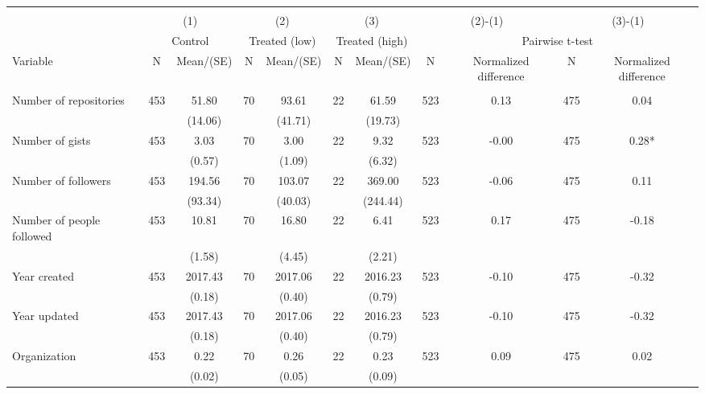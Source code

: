 \begin{tabular}{@{\extracolsep{5pt}}lcccccccccc}
\\[-1.8ex]\hline \hline \\[-1.8ex]
 & \multicolumn{2}{c}{(1)}  & \multicolumn{2}{c}{(2)}  & \multicolumn{2}{c}{(3)}  & \multicolumn{2}{c}{(2)-(1)} & \multicolumn{2}{c}{(3)-(1)} \\
 & \multicolumn{2}{c}{Control}  & \multicolumn{2}{c}{Treated (low)}  & \multicolumn{2}{c}{Treated (high)}  & \multicolumn{4}{c}{Pairwise t-test}  \\
Variable & N & Mean/(SE) & N & Mean/(SE) & N & Mean/(SE) & N & Normalized difference & N & Normalized difference \\ \hline \\[-1.8ex] 
Number of repositories   & 453    & 51.80    & 70    & 93.61    & 22    & 61.59    & 523    & 0.13    & 475    & 0.04   \\
 &   & (14.06)  &   & (41.71)  &   & (19.73)  &   &  &   &  \\ [1ex]
Number of gists   & 453    & 3.03    & 70    & 3.00    & 22    & 9.32    & 523    & -0.00    & 475    & 0.28*   \\
 &   & (0.57)  &   & (1.09)  &   & (6.32)  &   &  &   &  \\ [1ex]
Number of followers   & 453    & 194.56    & 70    & 103.07    & 22    & 369.00    & 523    & -0.06    & 475    & 0.11   \\
 &   & (93.34)  &   & (40.03)  &   & (244.44)  &   &  &   &  \\ [1ex]
Number of people followed   & 453    & 10.81    & 70    & 16.80    & 22    & 6.41    & 523    & 0.17    & 475    & -0.18   \\
 &   & (1.58)  &   & (4.45)  &   & (2.21)  &   &  &   &  \\ [1ex]
Year created   & 453    & 2017.43    & 70    & 2017.06    & 22    & 2016.23    & 523    & -0.10    & 475    & -0.32   \\
 &   & (0.18)  &   & (0.40)  &   & (0.79)  &   &  &   &  \\ [1ex]
Year updated   & 453    & 2017.43    & 70    & 2017.06    & 22    & 2016.23    & 523    & -0.10    & 475    & -0.32   \\
 &   & (0.18)  &   & (0.40)  &   & (0.79)  &   &  &   &  \\ [1ex]
Organization   & 453    & 0.22    & 70    & 0.26    & 22    & 0.23    & 523    & 0.09    & 475    & 0.02   \\
 &   & (0.02)  &   & (0.05)  &   & (0.09)  &   &  &   &  \\ [1ex]

\end{tabular}
